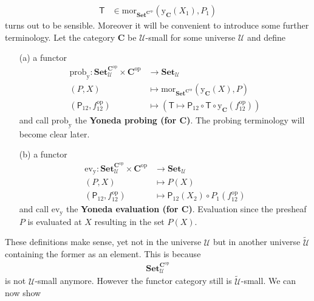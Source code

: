 \begin{align*}
  \mathsf{T}
  &\in
  \mathrm{mor}_{\mathbf{Set}^{\mathbf{C}^{\mathrm{op}}}}
  (\mathrm{y}_{\mathbf{C}}(X_{1}),P_{1})
\end{align*}
turns out to be sensible. Moreover it will be convenient to introduce some further terminology. Let the category $\mathbf{C}$ be $\mathcal{U}$-small for some universe $\mathcal{U}$ and define
\begin{enumerate}
\item[(a)]
a functor
\begin{align*}
  \mathrm{prob}_{\mathrm{y}}
  \colon
  \mathbf{Set}_{\mathcal{U}}^{\mathbf{C}^{\mathrm{op}}}
  \times
  \mathbf{C}^{\mathrm{op}}
  &\rightarrow
  \mathbf{Set}_{\mathcal{U}}
  \\
  (P,X)
  &\mapsto
  \mathrm{mor}_{\mathbf{Set}^{\mathbf{C}^{\mathrm{op}}}}
  (\mathrm{y}_{\mathbf{C}}(X),P)
  \\
  \left(
    \mathsf{P}_{12},
    f_{12}^{\mathrm{op}}
  \right)
  &\mapsto
  \left(
    \mathsf{T}
    \mapsto
    \mathsf{P}_{12}
    \circ
    \mathsf{T}
    \circ
    \mathrm{y}_{\mathbf{C}}(f_{12}^{\mathrm{op}})
  \right)
\end{align*}
and call $\mathrm{prob}_{\mathrm{y}}$ the \textbf{Yoneda probing (for $\mathbf{C}$)}. The {\glqq}probing{\grqq} terminology will become clear later. 
\item[(b)]
a functor
\begin{align*}
  \mathrm{ev}_{\mathrm{y}}
  \colon
  \mathbf{Set}_{\mathcal{U}}^{\mathbf{C}^{\mathrm{op}}}
  \times
  \mathbf{C}^{\mathrm{op}}
  &\rightarrow
  \mathbf{Set}_{\mathcal{U}}
  \\
  (P,X)
  &\mapsto
  P(X)
  \\
  \left(
    \mathsf{P}_{12},
    f_{12}^{\mathrm{op}}
  \right)
  &\mapsto
  \mathsf{P}_{12}(X_{2})
  \circ
  P_{1}(f_{12}^{\mathrm{op}})
\end{align*}
and call $\mathrm{ev}_{\mathrm{y}}$ the \textbf{Yoneda evaluation (for $\mathbf{C}$)}. {\glqq}Evaluation{\grqq} since the presheaf $P$ is evaluated at $X$ resulting in the set $P(X)$.
\end{enumerate}
These definitions make sense, yet not in the universe $\mathcal{U}$ but in another universe $\tilde{\mathcal{U}}$ containing the former as an element. This is because
\begin{align*}
  \mathbf{Set}_{\mathcal{U}}^{\mathbf{C}^{\mathrm{op}}}
\end{align*}
is not $\mathcal{U}$-small anymore. However the functor category still is $\tilde{\mathcal{U}}$-small. We can now show
